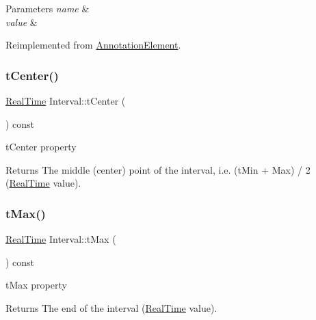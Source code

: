 \begin{DoxyParams}{Parameters}
{\em name} & \\
\hline
{\em value} & \\
\hline
\end{DoxyParams}


Reimplemented from \hyperlink{class_annotation_element_a206d8790fe92a7c8e6b703d026836584}{Annotation\+Element}.

\mbox{\label{class_interval_aa2f9a9cd972d33c1eb3af5e760e759b0}} 
\subsubsection{\texorpdfstring{t\+Center()}{tCenter()}}
{\footnotesize\ttfamily \hyperlink{struct_real_time}{Real\+Time} Interval\+::t\+Center (\begin{DoxyParamCaption}{ }\end{DoxyParamCaption}) const\hspace{0.3cm}{\ttfamily [inline]}}



t\+Center property 

\begin{DoxyReturn}{Returns}
The middle (center) point of the interval, i.\+e. (t\+Min + Max) / 2 (\hyperlink{struct_real_time}{Real\+Time} value). 
\end{DoxyReturn}
\mbox{\label{class_interval_ab9efa1b25d5e4997d99ad0f360c7b2d7}} 
\subsubsection{\texorpdfstring{t\+Max()}{tMax()}}
{\footnotesize\ttfamily \hyperlink{struct_real_time}{Real\+Time} Interval\+::t\+Max (\begin{DoxyParamCaption}{ }\end{DoxyParamCaption}) const\hspace{0.3cm}{\ttfamily [inline]}}



t\+Max property 

\begin{DoxyReturn}{Returns}
The end of the interval (\hyperlink{struct_real_time}{Real\+Time} value). 
\end{DoxyReturn}
\mbox{\label{class_interval_aba4daaa96ab1085b72cf19c896401593}} 
